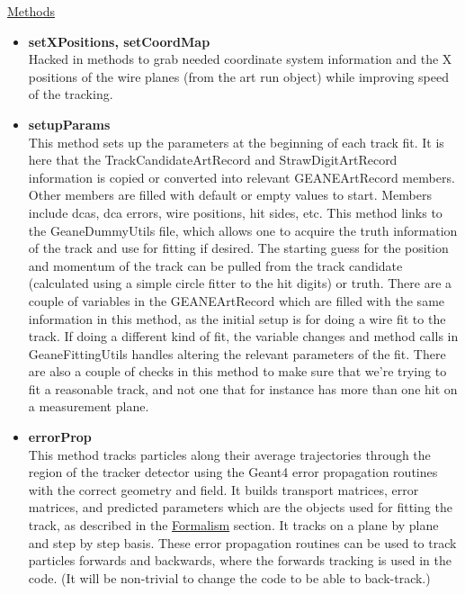 \begin{enumerate}
      \underline{Methods}

        \begin{itemize}

          \item{\bf{setXPositions, setCoordMap}} \\
          Hacked in methods to grab needed coordinate system information and the X positions of the wire planes (from the art run object) while improving speed of the tracking.

          \item{\bf{setupParams}} \\
          This method sets up the parameters at the beginning of each track fit. It is here that the TrackCandidateArtRecord and StrawDigitArtRecord information is copied or converted into relevant GEANEArtRecord members. Other members are filled with default or empty values to start. Members include dcas, dca errors, wire positions, hit sides, etc. This method links to the GeaneDummyUtils file, which allows one to acquire the truth information of the track and use for fitting if desired. The starting guess for the position and momentum of the track can be pulled from the track candidate (calculated using a simple circle fitter to the hit digits) or truth. There are a couple of variables in the GEANEArtRecord which are filled with the same information in this method, as the initial setup is for doing a wire fit to the track. If doing a different kind of fit, the variable changes and method calls in GeaneFittingUtils handles altering the relevant parameters of the fit. There are also a couple of checks in this method to make sure that we're trying to fit a reasonable track, and not one that for instance has more than one hit on a measurement plane.

          \item{\bf{errorProp}} \\ 
          This method tracks particles along their average trajectories through the region of the tracker detector using the Geant4 error propagation routines with the correct geometry and field. It builds transport matrices, error matrices, and predicted parameters which are the objects used for fitting the track, as described in the \hyperref[sec:Formalism]{Formalism} section. It tracks on a plane by plane and step by step basis. These error propagation routines can be used to track particles forwards and backwards, where the forwards tracking is used in the code. (It will be non-trivial to change the code to be able to back-track.) 


\end{itemize}
\end{enumerate}
